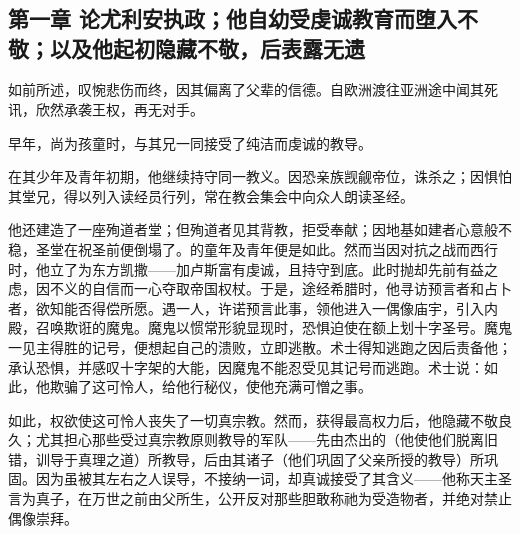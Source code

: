 

\section{}


\subsection{第一章  论尤利安执政；他自幼受虔诚教育而堕入不敬；以及他起初隐藏不敬，后表露无遗}

如前所述，叹惋悲伤而终，因其偏离了父辈的信德。自欧洲渡往亚洲途中闻其死讯，欣然承袭王权，再无对手。\par

早年，尚为孩童时，与其兄一同接受了纯洁而虔诚的教导。\par

在其少年及青年初期，他继续持守同一教义。因恐亲族觊觎帝位，诛杀之；因惧怕其堂兄，得以列入读经员行列，常在教会集会中向众人朗读圣经。\par

他还建造了一座殉道者堂；但殉道者见其背教，拒受奉献；因地基如建者心意般不稳，圣堂在祝圣前便倒塌了。的童年及青年便是如此。然而当因对抗之战而西行时，他立了为东方凯撒——加卢斯富有虔诚，且持守到底。此时抛却先前有益之虑，因不义的自信而一心夺取帝国权杖。于是，途经希腊时，他寻访预言者和占卜者，欲知能否得偿所愿。遇一人，许诺预言此事，领他进入一偶像庙宇，引入内殿，召唤欺诳的魔鬼。魔鬼以惯常形貌显现时，恐惧迫使在额上划十字圣号。魔鬼一见主得胜的记号，便想起自己的溃败，立即逃散。术士得知逃跑之因后责备他；承认恐惧，并感叹十字架的大能，因魔鬼不能忍受见其记号而逃跑。术士说：如此，他欺骗了这可怜人，给他行秘仪，使他充满可憎之事。\par

如此，权欲使这可怜人丧失了一切真宗教。然而，获得最高权力后，他隐藏不敬良久；尤其担心那些受过真宗教原则教导的军队——先由杰出的（他使他们脱离旧错，训导于真理之道）所教导，后由其诸子（他们巩固了父亲所授的教导）所巩固。因为虽被其左右之人误导，不接纳一词，却真诚接受了其含义——他称天主圣言为真子，在万世之前由父所生，公开反对那些胆敢称祂为受造物者，并绝对禁止偶像崇拜。\par


